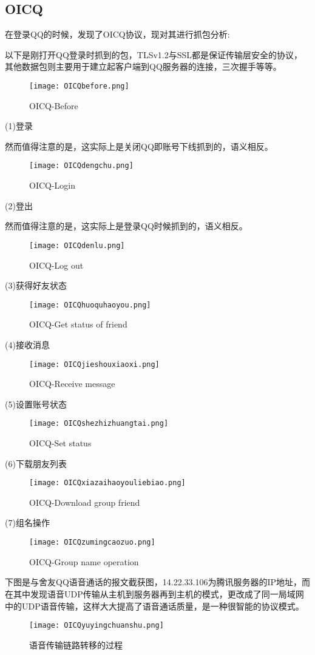 \documentclass{xjtureport}
\begin{document}
\subsection{OICQ}
在登录QQ的时候，发现了OICQ协议，现对其进行抓包分析:\par
以下是刚打开QQ登录时抓到的包，TLSv1.2与SSL都是保证传输层安全的协议，其他数据包则主要用于建立起客户端到QQ服务器的连接，三次握手等等。
\begin{figure}[H]
	\centering
	\texttt{[image: OICQbefore.png]}
	\caption{OICQ-Before}
\end{figure}
(1)登录\par
然而值得注意的是，这实际上是关闭QQ即账号下线抓到的，语义相反。
\begin{figure}[H]
	\centering
	\texttt{[image: OICQdengchu.png]}
	\caption{OICQ-Login}
\end{figure}
(2)登出\par
然而值得注意的是，这实际上是登录QQ时候抓到的，语义相反。
\begin{figure}[H]
	\centering
	\texttt{[image: OICQdenlu.png]}
	\caption{OICQ-Log out}
\end{figure}
(3)获得好友状态
\begin{figure}[H]
	\centering
	\texttt{[image: OICQhuoquhaoyou.png]}
	\caption{OICQ-Get status of friend}
\end{figure}
(4)接收消息
\begin{figure}[H]
	\centering
	\texttt{[image: OICQjieshouxiaoxi.png]}
	\caption{OICQ-Receive message}
\end{figure}
(5)设置账号状态
\begin{figure}[H]
	\centering
	\texttt{[image: OICQshezhizhuangtai.png]}
	\caption{OICQ-Set status}
\end{figure}
(6)下载朋友列表
\begin{figure}[H]
	\centering
	\texttt{[image: OICQxiazaihaoyouliebiao.png]}
	\caption{OICQ-Download group friend}
\end{figure}
(7)组名操作
\begin{figure}[H]
	\centering
	\texttt{[image: OICQzumingcaozuo.png]}
	\caption{OICQ-Group name operation}
\end{figure}
下图是与舍友QQ语音通话的报文截获图，14.22.33.106为腾讯服务器的IP地址，而在其中发现语音UDP传输从主机到服务器再到主机的模式，更改成了同一局域网中的UDP语音传输，这样大大提高了语音通话质量，是一种很智能的协议模式。
\begin{figure}[H]
	\centering
	\texttt{[image: OICQyuyingchuanshu.png]}
	\caption{语音传输链路转移的过程}
\end{figure}
\end{document}
